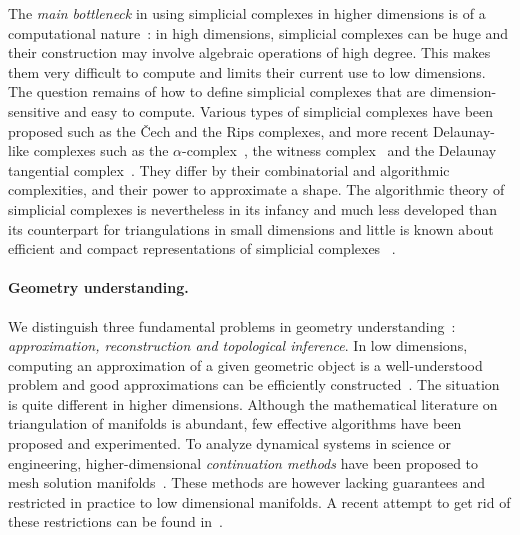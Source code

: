 The {\em main bottleneck} in using simplicial complexes in higher dimensions is of a computational nature~:  in high dimensions, simplicial complexes can be huge and their construction may  involve algebraic operations of high degree. This makes  them very difficult to compute and limits their current use to low dimensions.
The question remains of how to define simplicial complexes that are dimension-sensitive and easy to compute.  Various types of simplicial complexes have been proposed such as the \v{C}ech and the Rips complexes, and more recent Delaunay-like complexes such as the $\alpha$-complex~\cite{eks-sspp-83,he-ubds-95}, the witness complex~\cite{deSilva2008,cds-tewc-2004} and the Delaunay tangential complex~\cite{geometrica-7142i}. They differ by their combinatorial and algorithmic complexities, and their power to approximate a shape.  The algorithmic theory of simplicial complexes is nevertheless in its infancy and much less developed than its counterpart for triangulations in small dimensions%
and little is known about efficient and compact representations of simplicial complexes%
~\cite{Attali2011}.  


\paragraph{Geometry understanding.}
We distinguish three fundamental problems in geometry understanding~: {\em approximation, reconstruction and topological inference}.
In low dimensions, computing an approximation of a given geometric object is a well-understood problem and good approximations can be efficiently constructed~\cite{geometrica-bcmrv-ms-06,he-gtmg-2001}.  The situation is quite different in higher dimensions.  Although the mathematical literature on triangulation of manifolds is abundant, few effective algorithms have been proposed and experimented. 
To analyze {dynamical systems} in science or engineering, higher-dimensional {\em continuation methods} have been proposed to mesh solution manifolds~\cite{mh-mpc-2002}. These methods are however lacking guarantees and restricted in practice to low dimensional manifolds. A recent attempt to get rid of these restrictions can be found in~\cite{}.


